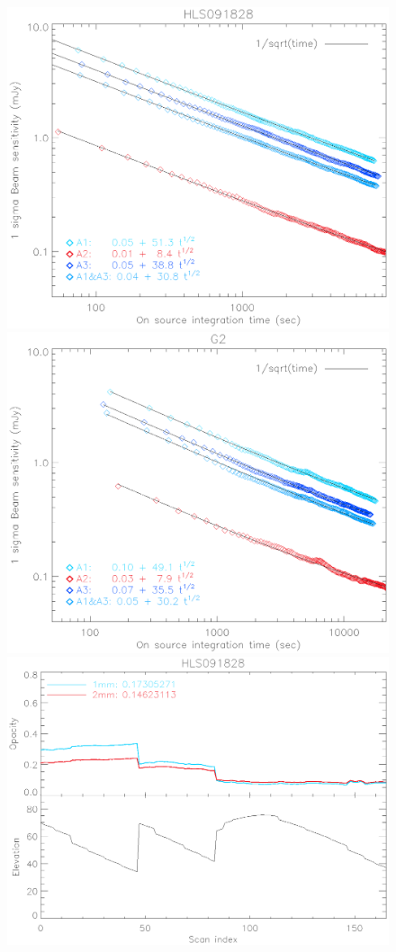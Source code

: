\begin{figure}
\begin{center}
\includegraphics[clip, angle=0, scale =0.42]{Figures/hls_nefd_vst.eps}
\includegraphics[clip, angle=0, scale =0.42]{Figures/g2_nefd_vst.eps}
\includegraphics[clip, angle=0, scale =0.4]{Figures/hls_opacity_and_elev.eps}

\end{center}
\end{figure}
